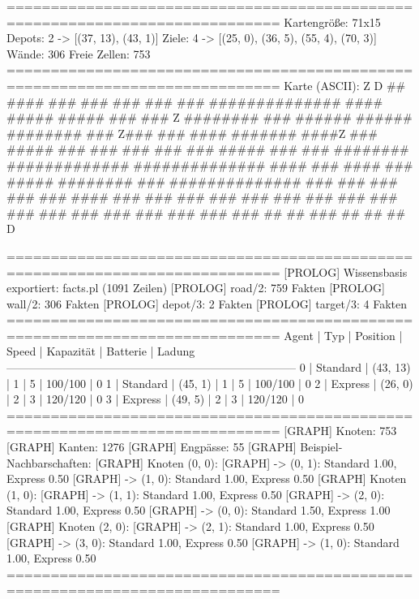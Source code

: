 =============================================================================
Kartengröße:           71x15
Depots:                2 -> [(37, 13), (43, 1)]
Ziele:                 4 -> [(25, 0), (36, 5), (55, 4), (70, 3)]
Wände:                 306
Freie Zellen:          753
=============================================================================
Karte (ASCII):
                         Z
                                           D
   ##       ####     ###       ###     ###         ###  ###
  ##############     ####     #####    #####       ###  ###           Z
  ########   ###    ######   ######    ########    ### Z###
  ###              #### ####### ####Z  ###  #####  ###  ###      ###
  ###              ###   #####   ###   ###    ########  #############
  ##############  ####    ###    ####  ###       #####  ########  ###
  ##############          ###          ###         ###  ###       ###
  ####       ###          ###          ###              ###       ###
  ###        ###          ###          ###              ###       ###
  ###        ###          ###          ###              ###       ###
   ##         ##          ###           ##              ##         ##
                                     D

=============================================================================
[PROLOG]   Wissensbasis exportiert: facts.pl (1091 Zeilen)
[PROLOG]   road/2:   759 Fakten
[PROLOG]   wall/2:   306 Fakten
[PROLOG]   depot/3:  2 Fakten
[PROLOG]   target/3: 4 Fakten
=============================================================================
 Agent | Typ       | Position    | Speed   | Kapazität  | Batterie  | Ladung
-----------------------------------------------------------------------------
 0     | Standard  | (43, 13)    | 1       | 5          | 100/100   | 0
 1     | Standard  | (45, 1)     | 1       | 5          | 100/100   | 0
 2     | Express   | (26, 0)     | 2       | 3          | 120/120   | 0
 3     | Express   | (49, 5)     | 2       | 3          | 120/120   | 0
=============================================================================
[GRAPH]    Knoten:              753
[GRAPH]    Kanten:              1276
[GRAPH]    Engpässe:            55
[GRAPH]    Beispiel-Nachbarschaften:
[GRAPH]      Knoten (0, 0):
[GRAPH]        -> (0, 1): Standard 1.00, Express 0.50
[GRAPH]        -> (1, 0): Standard 1.00, Express 0.50
[GRAPH]      Knoten (1, 0):
[GRAPH]        -> (1, 1): Standard 1.00, Express 0.50
[GRAPH]        -> (2, 0): Standard 1.00, Express 0.50
[GRAPH]        -> (0, 0): Standard 1.50, Express 1.00
[GRAPH]      Knoten (2, 0):
[GRAPH]        -> (2, 1): Standard 1.00, Express 0.50
[GRAPH]        -> (3, 0): Standard 1.00, Express 0.50
[GRAPH]        -> (1, 0): Standard 1.00, Express 0.50
=============================================================================